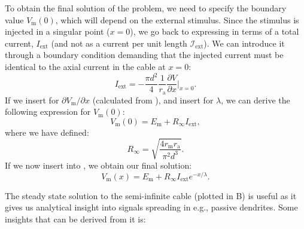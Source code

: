 To obtain the final solution of the problem, we need to specify the boundary value $V_\mathrm{m}(0)$, which will depend on the external stimulus. Since the stimulus is injected in a singular point ($x=0$), we go back to expressing in terms of a total current, $I_\text{ext}$ (and not as a current per unit length $\mathcal{I}_\text{ext}$). 
 We can introduce it through a boundary condition demanding that the injected current must be identical to the axial current in the cable at $x=0$:
\begin{equation}
I_\text{ext} = - \frac{\pi d^2}{4}\frac{1}{r_\text{a}} \frac{\partial V}{\partial x}   \Big|_{x=0}.
\end{equation}
If we insert for $\partial V_\mathrm{m}/\partial x$ (calculated from ), and insert  for $\lambda$, we can derive the following expression for $V_\mathrm{m}(0)$:
\begin{equation}
V_\mathrm{m}(0) = E_\mathrm{m} + R_{\infty}I_\text{ext}, 
\label{eq:Neuron:firstRinf}
\end{equation}
where we have defined:
\begin{equation}
R_{\infty} = \sqrt{\frac{4 r_\text{m} r_\text{a}}{\pi^2 d^3}}.
\label{eq:Neuron:Rinf}
\end{equation}
If we now insert  into , we obtain our final solution:
\begin{equation}
V_\mathrm{m}(x) = E_\mathrm{m}+R_{\infty}I_\text{ext}  e^{-x/\lambda}.
\label{eq:Neuron:semiinf5}
\end{equation}

The steady state solution to the semi-infinite cable (plotted in B) is useful as it gives us analytical insight into signals spreading in e.g., passive dendrites. Some insights that can be derived from it is:


